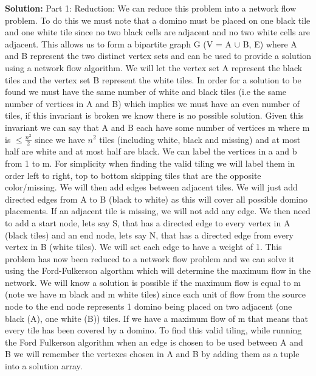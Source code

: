 \documentclass[12pt]{article}
\begin{document}
\textbf{Solution:}
Part 1: Reduction: We can reduce this problem into a network flow problem. To do this we must note that a domino must be placed on one black tile and one white tile since no two black cells are adjacent and no two white cells are adjacent. This allows us to form a bipartite graph G (V = A $\cup$ B, E) where A and B represent the two distinct vertex sets and can be used to provide a solution using a network flow algorithm. We will let the vertex set A represent the black tiles and the vertex set B represent the white tiles. In order for a solution to be found we must have the same number of white and black tiles (i.e the same number of vertices in A and B) which implies we must have an even number of tiles, if this invariant is broken we know there is no possible solution. Given this invariant we can say that A and B each have some number of vertices m where m is $\le \frac{n^2}{2}$ since we have $n^2$ tiles (including white, black and missing) and at most half are white and at most half are black. We can label the vertices in a and b from 1 to m. For simplicity when finding the valid tiling we will label them in order left to right, top to bottom skipping tiles that are the opposite color/missing. We will then add edges between adjacent tiles. We will just add directed edges from A to B (black to white) as this will cover all possible domino placements. If an adjacent tile is missing, we will not add any edge. We then need to add a start node, lets say S, that has a directed edge to every vertex in A (black tiles) and an end node, lets say N, that has a directed edge from every vertex in B (white tiles). We will set each edge to have a weight of 1. This problem has now been reduced to a network flow problem and we can solve it using the Ford-Fulkerson algorthm which will determine the maximum flow in the network. We will know a solution is possible if the maximum flow is equal to m (note we have m black and m white tiles) since each unit of flow from the source node to the end node represents 1 domino being placed on two adjacent (one black (A), one white (B)) tiles. If we have a maximum flow of m that means that every tile has been covered by a domino. To find this valid tiling, while running the Ford Fulkerson algorithm when an edge is chosen to be used between A and B we will remember the vertexes chosen in A and B by adding them as a tuple into a solution array. \\
\end{document}
